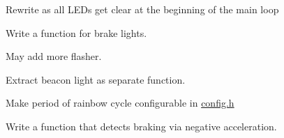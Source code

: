 
\begin{DoxyRefList}
\item[\label{todo__todo000002}%
\hypertarget{todo__todo000002}{}%
Global \hyperlink{group__car_ga6b1fd674445dd1c654dfe8b8b65f168e}{beam} (unsigned long state)]Rewrite as all L\+E\+Ds get clear at the beginning of the main loop  
\item[\label{todo__todo000001}%
\hypertarget{todo__todo000001}{}%
File \hyperlink{car__basics_8ino}{car\+\_\+basics.ino} ]Write a function for brake lights.  
\item[\label{todo__todo000003}%
\hypertarget{todo__todo000003}{}%
File \hyperlink{police_8ino}{police.ino} ]May add more flasher. 

Extract beacon light as separate function.  
\item[\label{todo__todo000004}%
\hypertarget{todo__todo000004}{}%
File \hyperlink{rainbow_8ino}{rainbow.ino} ]Make period of rainbow cycle configurable in \hyperlink{config_8h}{config.\+h}  
\item[\label{todo__todo000005}%
\hypertarget{todo__todo000005}{}%
File \hyperlink{speed_8ino}{speed.ino} ]Write a function that detects braking via negative acceleration. 
\end{DoxyRefList}